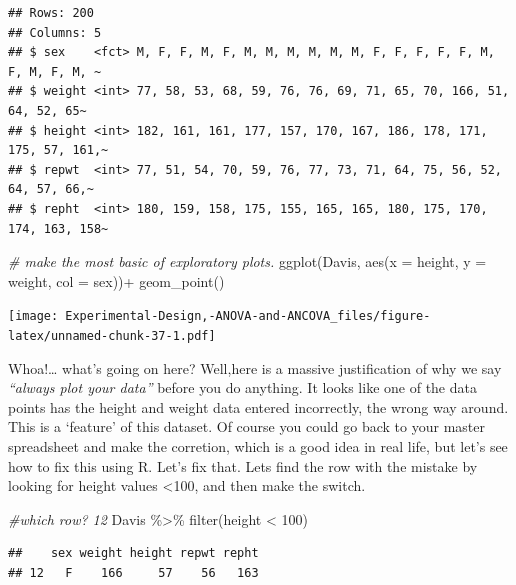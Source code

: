 \documentclass[
]{book}
\newenvironment{Shaded}{\begin{snugshade}}{\end{snugshade}}
\newcommand{\AttributeTok}[1]{\textcolor[rgb]{0.77,0.63,0.00}{#1}}
\newcommand{\CommentTok}[1]{\textcolor[rgb]{0.56,0.35,0.01}{\textit{#1}}}
\newcommand{\DecValTok}[1]{\textcolor[rgb]{0.00,0.00,0.81}{#1}}
\newcommand{\FunctionTok}[1]{\textcolor[rgb]{0.00,0.00,0.00}{#1}}
\newcommand{\NormalTok}[1]{#1}
\newcommand{\SpecialCharTok}[1]{\textcolor[rgb]{0.00,0.00,0.00}{#1}}
\begin{document}
\begin{verbatim}
## Rows: 200
## Columns: 5
## $ sex    <fct> M, F, F, M, F, M, M, M, M, M, M, F, F, F, F, F, M, F, M, F, M, ~
## $ weight <int> 77, 58, 53, 68, 59, 76, 76, 69, 71, 65, 70, 166, 51, 64, 52, 65~
## $ height <int> 182, 161, 161, 177, 157, 170, 167, 186, 178, 171, 175, 57, 161,~
## $ repwt  <int> 77, 51, 54, 70, 59, 76, 77, 73, 71, 64, 75, 56, 52, 64, 57, 66,~
## $ repht  <int> 180, 159, 158, 175, 155, 165, 165, 180, 175, 170, 174, 163, 158~
\end{verbatim}

\begin{Shaded}
\begin{Highlighting}[]
\CommentTok{\# make the most basic of exploratory plots.}
\FunctionTok{ggplot}\NormalTok{(Davis, }\FunctionTok{aes}\NormalTok{(}\AttributeTok{x =}\NormalTok{ height, }\AttributeTok{y =}\NormalTok{ weight, }\AttributeTok{col =}\NormalTok{ sex))}\SpecialCharTok{+}
  \FunctionTok{geom\_point}\NormalTok{()}
\end{Highlighting}
\end{Shaded}

\texttt{[image: Experimental-Design,-ANOVA-and-ANCOVA\_files/figure-latex/unnamed-chunk-37-1.pdf]}

Whoa!\ldots{} what's going on here? Well,here is a massive justification of why we say \emph{``always plot your data''} before you do anything. It looks like one of the data points has the height and weight data entered incorrectly, the wrong way around. This is a `feature' of this dataset. Of course you could go back to your master spreadsheet and make the corretion, which is a good idea in real life, but let's see how to fix this using R. Let's fix that. Lets find the row with the mistake by looking for height values \textless100, and then make the switch.

\begin{Shaded}
\begin{Highlighting}[]
\CommentTok{\#which row? 12}
\NormalTok{Davis }\SpecialCharTok{\%\textgreater{}\%} \FunctionTok{filter}\NormalTok{(height }\SpecialCharTok{\textless{}} \DecValTok{100}\NormalTok{)}
\end{Highlighting}
\end{Shaded}

\begin{verbatim}
##    sex weight height repwt repht
## 12   F    166     57    56   163
\end{verbatim}

\begin{Shaded}
\end{Shaded}
\end{document}

